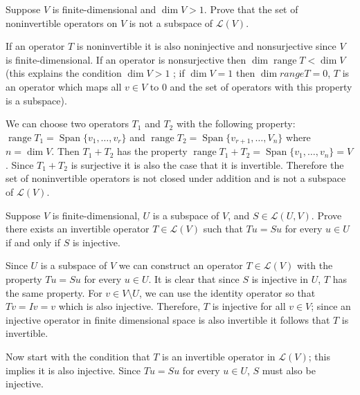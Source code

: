 \documentclass[11pt,a4paper]{scrartcl}
\DeclareMathOperator{\range}{range}
\DeclareMathOperator{\Span}{Span}
\newcommand{\lmap}[2]{\mathcal{L}(#1,#2)}
\newcounter{problem}
\begin{document}
\newpage
\begin{problem}[3.D.2]
    { %
        Suppose $V$ is finite-dimensional and $\dim V>1$. Prove that the set of noninvertible operators on $V$
        is not a subspace of $\mathcal{L}(V)$.
    }
    { %
        If an operator $T$ is noninvertible it is also noninjective and nonsurjective since $V$ is finite-dimensional. 
        If an operator is nonsurjective then $\dim \range T < \dim V$ (this explains the condition $\dim V>1$ ; if $\dim V=1$
        then $\dim range T=0$, $T$ is an operator which maps all $v \in V$ to 0 and the set of operators with this property
        is a subspace). 
        
        We can choose two operators $T_1$ and $T_2$ with the following property: $\range T_1=\Span\{v_1,\ldots,v_r\}$
        and $\range T_2=\Span\{v_{r+1},\ldots,V_n\}$ where $n=\dim V$. Then $T_1+T_2$ has the property
        $\range T_1+T_2 = \Span\{v_1,\ldots,v_n\}=V$. Since $T_1+T_2$ is surjective it is also the case that it is invertible.
        Therefore the set of noninvertible operators is not closed under addition and is not a subspace of $\mathcal{L}(V)$.
     }
\end{problem}
\begin{problem}[3.D.3]
    {
        Suppose $V$ is finite-dimensional, $U$ is a subspace of $V$, and $S\in\lmap{U}{V}$.
        Prove there exists an invertible operator $T\in \mathcal{L}(V)$ such that $Tu=Su$
        for every $u\in U$ if and only if $S$ is injective.
    }
    {
        Since $U$ is a subspace of $V$ we can construct an operator $T\in\mathcal{L}(V)$
        with the property $Tu=Su$ for every $u\in U$. It is clear that since $S$ is injective in $U$, $T$ has
        the same property. For $v \in V\setminus U$, we can use the identity operator so that $Tv=Iv=v$ which is also 
        injective. Therefore, $T$ is injective for all $v \in V$; since an injective operator in finite dimensional
        space is also invertible it follows that $T$ is invertible.
        
        Now start with the condition that $T$ is an invertible operator in $\mathcal{L}(V)$; this implies it is also 
        injective. Since $Tu=Su$ for every $u \in U$, $S$ must also be injective.  
    }
\end{problem}
\end{document}
